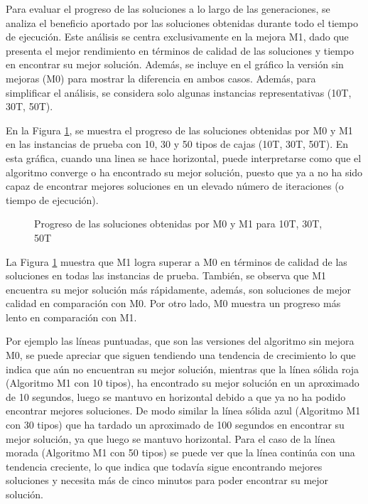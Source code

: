 \documentclass[openany]{article}
\begin{document}
Para evaluar el progreso de las soluciones a lo largo de las generaciones, se analiza el beneficio aportado por las soluciones obtenidas durante todo el tiempo de ejecución. Este análisis se centra exclusivamente en la mejora M1, dado que presenta el mejor rendimiento en términos de calidad de las soluciones y tiempo en encontrar su mejor solución. Además, se incluye en el gráfico la versión sin mejoras (M0) para mostrar la diferencia en ambos casos. Además, para simplificar el análisis, se considera solo algunas instancias representativas (10T, 30T, 50T).

En la Figura \ref{fig:progreso}, se muestra el progreso de las soluciones obtenidas por M0 y M1 en las instancias de prueba con 10, 30 y 50 tipos de cajas (10T, 30T, 50T). En esta gráfica, cuando una linea se hace horizontal, puede interpretarse como que el algoritmo converge o ha encontrado su mejor solución, puesto que ya a no ha sido capaz de encontrar mejores soluciones en un elevado número de iteraciones (o tiempo de ejecución).

\begin{figure}[H]
    \centering
    
    \caption{Progreso de las soluciones obtenidas por M0 y M1 para 10T, 30T, 50T}
    \label{fig:progreso}
\end{figure}

La Figura \ref{fig:progreso} muestra que M1 logra superar a M0 en términos de calidad de las soluciones en todas las instancias de prueba. También, se observa que M1 encuentra su mejor solución más rápidamente, además, son soluciones de mejor calidad en comparación con M0. Por otro lado, M0 muestra un progreso más lento en comparación con M1.

Por ejemplo las líneas puntuadas, que son las versiones del algoritmo sin mejora M0, se puede apreciar que siguen tendiendo una tendencia de crecimiento lo que indica que aún no encuentran su mejor solución, mientras que la línea sólida roja (Algoritmo M1 con 10 tipos), ha encontrado su mejor solución en un aproximado de 10 segundos, luego se mantuvo en horizontal debido a que ya no ha podido encontrar mejores soluciones. De modo similar la línea sólida azul (Algoritmo M1 con 30 tipos) que ha tardado un aproximado de 100 segundos en encontrar su mejor solución, ya que luego se mantuvo horizontal. Para el caso de la línea morada (Algoritmo M1 con 50 tipos) se puede ver que la línea continúa con una tendencia creciente, lo que indica que todavía sigue encontrando mejores soluciones y  necesita más de cinco minutos para poder encontrar su mejor solución.
\end{document}
